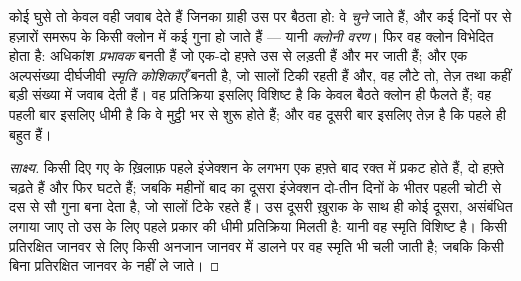 \begin{proposition}[वरण और विस्तार]\label{prop:g12:adaptive-immunity:selection}
कोई  घुसे तो केवल वही  जवाब देते हैं जिनका ग्राही उस पर बैठता
हो: वे \emph{चुने} जाते हैं, और कई दिनों पर  से हज़ारों समरूप
 के किसी क्लोन में कई गुना हो जाते हैं --- यानी
\emph{क्लोनी वरण}। फिर वह क्लोन विभेदित होता है: अधिकांश
 \emph{प्रभावक } बनती हैं जो एक-दो हफ़्ते उस  से
लड़ती हैं और मर जाती हैं; और एक अल्पसंख्या दीर्घजीवी
\emph{स्मृति कोशिकाएँ} बनती है, जो सालों टिकी रहती हैं
और, वह  लौटे तो, तेज़ तथा कहीं बड़ी संख्या में जवाब देती हैं। वह
प्रतिक्रिया इसलिए विशिष्ट है कि केवल बैठते क्लोन ही फैलते हैं; वह पहली बार
इसलिए धीमी है कि वे मुट्ठी भर  से शुरू होते हैं; और वह दूसरी बार
इसलिए तेज़ है कि  पहले ही बहुत हैं।
\end{proposition}
\begin{proof}[साक्ष्य]
किसी दिए गए  के ख़िलाफ़  पहले इंजेक्शन के लगभग एक हफ़्ते
बाद रक्त में प्रकट होते हैं, दो हफ़्ते चढ़ते हैं और फिर घटते हैं; जबकि महीनों
बाद का दूसरा इंजेक्शन दो-तीन दिनों के भीतर पहली चोटी से दस से सौ गुना
 बना देता है, जो सालों टिके रहते हैं। उस दूसरी ख़ुराक के साथ ही
कोई दूसरा, असंबंधित  लगाया जाए तो उस  के लिए पहले प्रकार की
धीमी प्रतिक्रिया मिलती है: यानी वह स्मृति विशिष्ट है। किसी प्रतिरक्षित जानवर
से लिए  किसी अनजान जानवर में डालने पर वह स्मृति भी चली जाती है; जबकि
किसी बिना प्रतिरक्षित जानवर के  नहीं ले जाते।
\end{proof}

